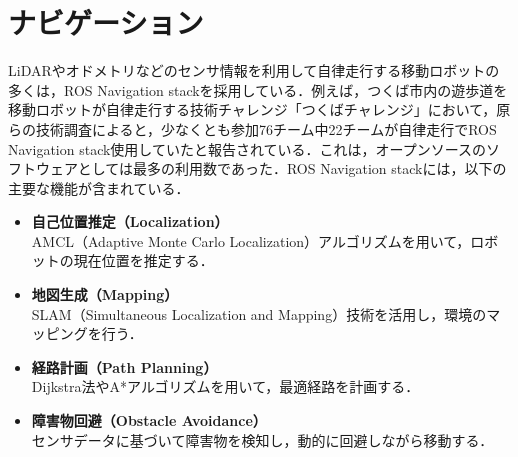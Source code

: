 
\section{ナビゲーション}\label{sec:navigation-stack}
LiDARやオドメトリなどのセンサ情報を利用して自律走行する移動ロボットの多くは，ROS Navigation stack\cite{nav1,nav2}を採用している．例えば，つくば市内の遊歩道を移動ロボットが自律走行する技術チャレンジ「つくばチャレンジ」において，原らの技術調査\cite{robomech2024-hara}によると，少なくとも参加76チーム中22チームが自律走行でROS Navigation stack使用していたと報告されている．これは，オープンソースのソフトウェアとしては最多の利用数であった．ROS Navigation stackには，以下の主要な機能が含まれている．

\begin{itemize}
     \item \textbf{自己位置推定（Localization）}\\
     AMCL（Adaptive Monte Carlo Localization）アルゴリズムを用いて，ロボットの現在位置を推定する．
     \item \textbf{地図生成（Mapping）}\\
     SLAM（Simultaneous Localization and Mapping）技術を活用し，環境のマッピングを行う．
     \item \textbf{経路計画（Path Planning）}\\
     Dijkstra法\cite{dijkstra2022note}やA*アルゴリズム\cite{hart1968formal-astar}を用いて，最適経路を計画する．
     \item \textbf{障害物回避（Obstacle Avoidance）}\\
     センサデータに基づいて障害物を検知し，動的に回避しながら移動する．
\end{itemize}

\newpage
